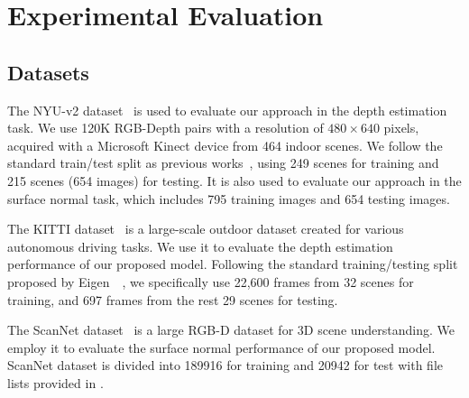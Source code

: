 \section{Experimental Evaluation}
\subsection{Datasets}
The {NYU-v2} dataset~\cite{silberman2012indoor} is used to evaluate our approach in the depth estimation task. We use 120K RGB-Depth pairs with a resolution of $480\times640$ pixels, acquired with a Microsoft Kinect device from 464 indoor scenes. We follow the standard train/test split as previous works~\cite{eigen2014depth}, using 249 scenes for training and 215 scenes (654 images) for testing. It is also used to evaluate our approach in the surface normal task, which includes 795 training images and 654 testing images.

The {KITTI} dataset~\cite{Geiger2013IJRR} is a large-scale outdoor dataset created for various autonomous driving tasks. We use it to evaluate the depth estimation performance of our proposed model. Following the standard training/testing split proposed by Eigen~\etal~\cite{eigen2014depth}, we specifically use 22,600 frames from 32 scenes for training, and 697 frames from the rest 29 scenes for testing.

The {ScanNet} dataset~\cite{dai2017scannet} is a large RGB-D dataset for 3D scene understanding. We employ it to evaluate the surface normal performance of our proposed model. ScanNet dataset is divided into 189916 for training and 20942 for test with file lists provided in \cite{dai2017scannet}.

